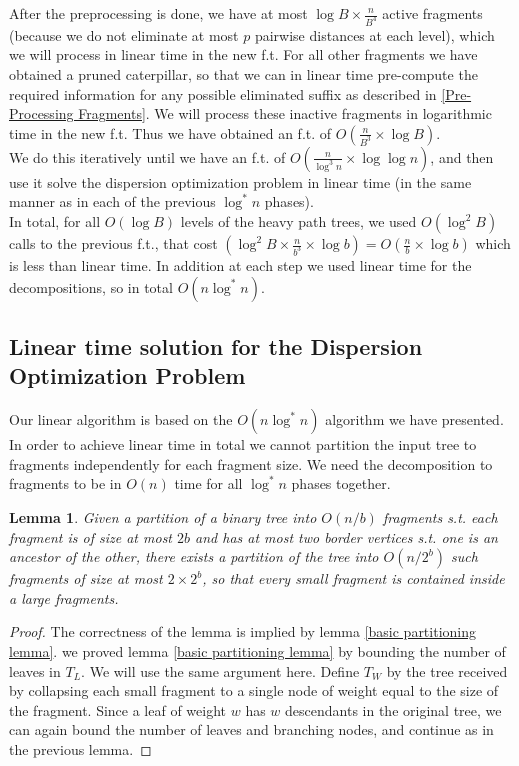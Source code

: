 \documentclass[11pt,a4paper]{article}
\newtheorem{lemma}{Lemma}
\theoremstyle{definition}
\theoremstyle{remark}
\begin{document}
After the preprocessing is done, we have at most $\log B \times \frac{n}{B^4}$ active fragments (because we do not eliminate at most $p$ pairwise distances at each level), which we will process in linear time in the new f.t. For all other fragments we have obtained a pruned caterpillar, so that we can in linear time pre-compute the required information for any possible eliminated suffix as described in \ref{Pre-Processing Fragments}. We will process these inactive fragments in logarithmic time in the new f.t. Thus we have obtained an f.t. of $O(\frac{n}{B^3} \times \log B)$.\\
We do this iteratively until we have an f.t. of $O(\frac{n}{\log ^3n} \times \log \log n)$, and then use it solve the dispersion optimization problem in linear time (in the same manner as in each of the previous $\log ^*n$ phases).\\
In total, for all $O(\log B)$ levels of the heavy path trees, we used $O(\log ^2B)$ calls to the previous f.t., that cost $(\log ^2B \times \frac{n}{b^3} \times \log b)=O(\frac{n}{b} \times \log b)$ which is less than linear time. In addition at each step we used linear time for the decompositions, so in total $O(n \log ^*n)$. 

\subsection{Linear time solution for the Dispersion Optimization Problem}
Our linear algorithm is based on the $O(n \log ^*n)$ algorithm we have presented. In order to achieve linear time in total we cannot partition the input tree to fragments independently for each fragment size. We need the decomposition to fragments to be in $O(n)$ time for all $\log ^*n$ phases together.
\begin{lemma}
Given a partition of a binary tree into $O(n/b)$ fragments s.t. each fragment is of size at most $2b$ and has at most two border vertices s.t. one is an ancestor of the other, there exists a partition of the tree into $O(n/2^b)$ such fragments of size at most $2 \times 2^b$, so that every small fragment is contained inside a large fragments.
\end{lemma}
\begin{proof}
The correctness of the lemma is implied by lemma \ref{basic partitioning lemma}. we proved lemma \ref{basic partitioning lemma} by bounding the number of leaves in $T_L$. We will use the same argument here. Define $T_W$ by the tree received by collapsing each small fragment to a single node of weight equal to the size of the fragment. Since a leaf of weight $w$ has $w$ descendants in the original tree, we can again bound the number of leaves and branching nodes, and continue as in the previous lemma.
\end{proof}
\end{document}
